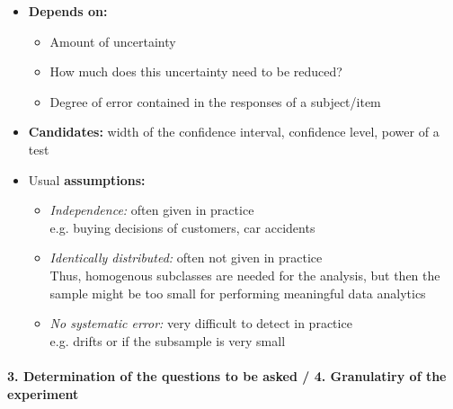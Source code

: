 \documentclass[a4paper, landscape, 6pt, fleqn]{scrartcl}
\renewcommand{\emph}[1]{\textbf{#1}}
\begin{document}
\begin{multicols*}{4}
\begin{itemize}
\item \emph{Depends on:}
\begin{itemize}
\item Amount of uncertainty
\item How much does this uncertainty need to be reduced?
\item Degree of error contained in the responses of a subject/item
\end{itemize}
\item \emph{Candidates:} width of the confidence interval, confidence level, power of a test
\item Usual \emph{assumptions:}
\begin{itemize}
\item \textit{Independence:} often given in practice \\
e.g. buying decisions of customers, car accidents
\item \textit{Identically distributed:} often not given in practice \\
Thus, homogenous subclasses are needed for the analysis, but then the sample might be too small for performing meaningful data analytics
\item \textit{No systematic error:} very difficult to detect in practice \\
e.g. drifts or if the subsample is very small
\end{itemize}
\end{itemize}

\paragraph{3. Determination of the questions to be asked / 4. Granulatiry of the experiment}


\end{multicols*}
\end{document}
